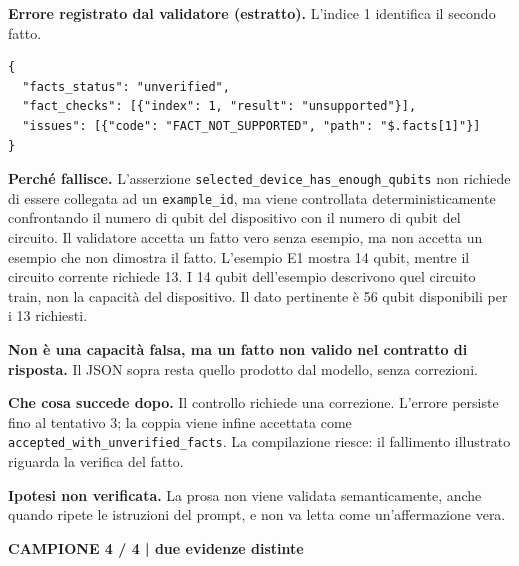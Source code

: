 \documentclass[a4paper,10pt]{article}
\newcommand{\tagline}[1]{{\small\color{ink}\textbf{#1}}\par}
\begin{document}
\begin{center}
\end{center}
\textbf{Errore registrato dal validatore (estratto).} L'indice 1 identifica il secondo fatto.
\begin{lstlisting}
{
  "facts_status": "unverified",
  "fact_checks": [{"index": 1, "result": "unsupported"}],
  "issues": [{"code": "FACT_NOT_SUPPORTED", "path": "$.facts[1]"}]
}
\end{lstlisting}
\textbf{Perché fallisce.} L'asserzione \texttt{selected\_device\_has\_enough\_qubits}
non richiede di essere collegata ad un \texttt{example\_id}, ma viene controllata deterministicamente confrontando il numero di qubit del dispositivo con il numero di qubit del circuito. 
Il validatore accetta un fatto vero senza esempio, ma non accetta un esempio che non dimostra il fatto. L'esempio E1 mostra 14 qubit, mentre il circuito corrente richiede 13.
I 14 qubit dell'esempio descrivono quel circuito train,
non la capacità del dispositivo. Il dato pertinente è 56 qubit disponibili per i 13 richiesti.\par
\textbf{Non è una capacità falsa, ma un fatto non valido nel contratto di risposta.}
Il JSON sopra resta quello prodotto dal modello, senza correzioni.\par
\textbf{Che cosa succede dopo.} Il controllo richiede una correzione. L'errore persiste fino al
tentativo 3; la coppia viene infine accettata come \texttt{accepted\_with\_unverified\_facts}.
La compilazione riesce: il fallimento illustrato riguarda la verifica del fatto.\par
{\color{warn}\textbf{Ipotesi non verificata.}} La prosa non viene validata semanticamente,
anche quando ripete le istruzioni del prompt, e non va letta come un'affermazione vera.\par

\newpage
\tagline{CAMPIONE 4 / 4 | due evidenze distinte}
\end{document}
